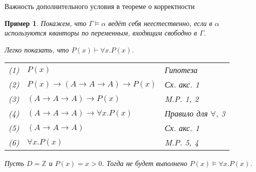 \documentclass[aspectratio=169]{beamer}
\newtheorem{exm}{Пример}[section]
\begin{document}
\begin{frame}{Важность дополнительного условия в теореме о корректности}
\begin{exm}Покажем, что $\Gamma\models\alpha$ ведёт себя неестественно, если 
в $\alpha$ используются кванторы по переменным, входящим свободно в $\Gamma$.\pause

Легко показать, что $P(x)\vdash \forall x.P(x)$. \pause
\begin{tabular}{lll}
(1) & $P(x)$ & Гипотеза \\
(2) & $P(x)\rightarrow (A\rightarrow A \rightarrow A) \rightarrow P(x)$ & Сх. акс. 1\\
(3) & $(A\rightarrow A \rightarrow A) \rightarrow P(x)$ & M.P. 1, 2\\
(4) & $(A\rightarrow A \rightarrow A) \rightarrow \forall x.P(x)$ & Правило для $\forall$, 3\\
(5) & $(A\rightarrow A \rightarrow A)$ & Сх. акс. 1\\
(6) & $\forall x.P(x)$ & M.P. 5, 4
\end{tabular}\pause

Пусть $D = \mathbb{Z}$ и $P(x) = x > 0$. Тогда не будет выполнено $P(x)\models \forall x.P(x)$.
\end{exm}
\end{frame}
\end{document}
